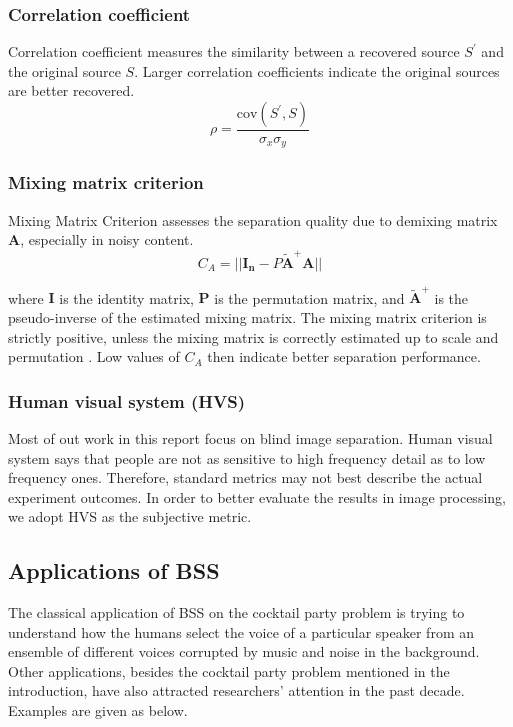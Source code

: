\subsubsection{Correlation coefficient}
Correlation coefficient measures the similarity between a recovered source $S^{'}$ and the original source $S$. Larger correlation coefficients indicate the original sources are better recovered.
\begin{equation}
    \rho = \frac{\text{cov}(S^{'},S)}{\sigma_x \sigma_y}
\end{equation}

\subsubsection{Mixing matrix criterion}
Mixing Matrix Criterion assesses the separation quality due to demixing matrix $\mathbf{A}$, especially in noisy content.
\begin{equation}
    C_A = ||\mathbf{I_n} - P\tilde{\mathbf{A}}^{+}\mathbf{A} ||
\end{equation}

where $\mathbf{I}$ is the identity matrix, $\mathbf{P}$ is the permutation matrix, and $\tilde{\mathbf{A}}^{+}$ is the pseudo-inverse of the estimated mixing matrix. The mixing matrix criterion is strictly positive, unless the mixing matrix is correctly estimated up to scale and permutation \cite{VAbolghasemi2012}. Low values of $C_A$ then indicate better separation performance.
 
\subsubsection{Human visual system (HVS)}
Most of out work in this report focus on blind image separation. Human visual system says that people are not as sensitive to high frequency detail as to low frequency ones. Therefore, standard metrics may not best describe the actual experiment outcomes. In order to better evaluate the results in image processing, we adopt HVS as the subjective metric.

\subsection{Applications of BSS}
The classical application of BSS on the cocktail party problem is trying to understand how the humans select the voice of a particular speaker from an ensemble of different voices corrupted by music and noise in the background. Other applications, besides the cocktail party problem mentioned in the introduction, have also attracted researchers' attention in the past decade. Examples are given as below. \\

